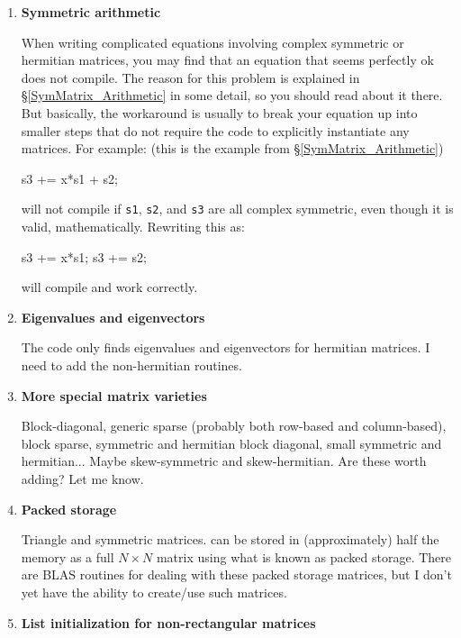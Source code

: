 \documentclass[twoside,letterpaper,11pt]{article}
\renewcommand{\tt}[1]{{\lstinline {#1}}}
\begin{document}
\begin{enumerate}
\item
\textbf{Symmetric arithmetic}

When writing complicated equations involving complex symmetric or hermitian matrices, 
you may find that an equation that seems perfectly ok does not compile.
The reason for this problem is explained in \S\ref{SymMatrix_Arithmetic} in some detail, 
so you should read about it there.  But basically, the workaround is usually
to break your equation up into smaller steps that do not require the code to 
explicitly instantiate any matrices.  For example: (this is the example from \S\ref{SymMatrix_Arithmetic})
\begin{tmvcode}
s3 += x*s1 + s2;
\end{tmvcode}
will not compile if \tt{s1}, \tt{s2}, and \tt{s3} are all complex symmetric, even though it is 
valid, mathematically.  Rewriting this as:
\begin{tmvcode}
s3 += x*s1;
s3 += s2;
\end{tmvcode}
will compile and work correctly.

\item
\textbf{Eigenvalues and eigenvectors}

The code only finds eigenvalues and eigenvectors for hermitian matrices.
I need to add the non-hermitian routines.

\item
\textbf{More special matrix varieties}

Block-diagonal, generic sparse (probably both
row-based and column-based), block sparse, symmetric and hermitian block
diagonal, small symmetric and hermitian...
Maybe skew-symmetric and skew-hermitian.  Are these worth adding?  Let me know.

\item
\textbf{Packed storage}

Triangle and symmetric matrices. can be stored in (approximately) half the 
memory as a full $N \times N$ matrix using what is known as packed storage.  
There are BLAS routines for dealing with
these packed storage matrices, but I don't yet have the ability to 
create/use such matrices.

\item
\textbf{List initialization for non-rectangular matrices}


\end{enumerate}
\end{document}
